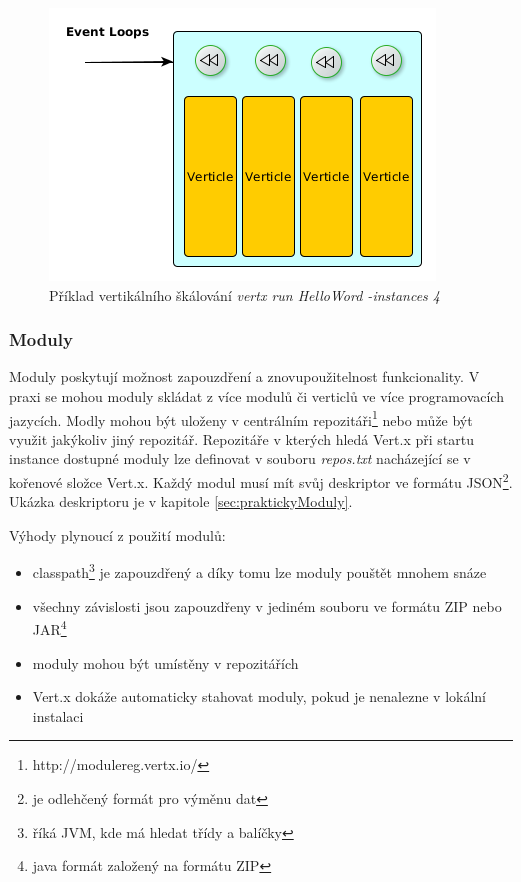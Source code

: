 \begin{figure}
\begin{centering}
\includegraphics[scale=0.5]{obrazky/instance4}
\par\end{centering}
\caption{Příklad vertikálního škálování \emph{vertx run HelloWord -instances 4} \label{fig:instance4}}
\end{figure}

\subsubsection{Moduly}\label{sub:moduly}

Moduly poskytují možnost zapouzdření a znovupoužitelnost funkcionality. V praxi se mohou moduly skládat z více modulů či verticlů ve více programovacích jazycích. Modly mohou být uloženy v centrálním repozitáři\footnote{http://modulereg.vertx.io/} nebo může být využit jakýkoliv jiný repozitář. Repozitáře v kterých hledá Vert.x při startu instance dostupné moduly lze definovat v souboru \emph{repos.txt} nacházející se v kořenové složce Vert.x. Každý modul musí mít svůj deskriptor ve formátu JSON\footnote{je odlehčený formát pro výměnu dat}. Ukázka deskriptoru je v kapitole \ref{sec:praktickyModuly}.

Výhody plynoucí z použití modulů:
\begin{itemize}
\item{classpath\footnote{říká JVM, kde má hledat třídy a balíčky} je zapouzdřený a díky tomu lze moduly pouštět mnohem snáze}
\item{všechny závislosti jsou zapouzdřeny v jediném souboru ve formátu ZIP nebo JAR\footnote{java formát založený na formátu ZIP}}
\item{moduly mohou být umístěny v repozitářích}
\item{Vert.x dokáže automaticky stahovat moduly, pokud je nenalezne v lokální instalaci}
\end{itemize}

